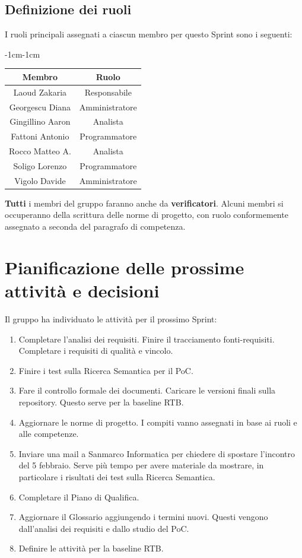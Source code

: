 \documentclass[a4paper,12pt]{article}
\begin{document}
\subsection{Definizione dei ruoli}
I ruoli principali assegnati a ciascun membro per questo Sprint sono i seguenti:
\begin{table}[H]
    \begin{adjustwidth}{-1cm}{-1cm}
    \centering
\begin{tabular}{|c|c|}
    \hline
    \textbf{Membro} & \textbf{Ruolo} \\
    \hline
    Laoud Zakaria & Responsabile \\
    \hline
    Georgescu Diana & Amministratore \\
    \hline
    Gingillino Aaron & Analista \\
    \hline
    Fattoni Antonio & Programmatore \\
    \hline
    Rocco Matteo A. & Analista \\
    \hline
    Soligo Lorenzo & Programmatore \\
    \hline
    Vigolo Davide & Amministratore \\
    \hline
\end{tabular}
    \end{adjustwidth}
\end{table}
\textbf{Tutti} i membri del gruppo faranno anche da \textbf{verificatori}. Alcuni membri si occuperanno della scrittura delle norme di progetto, con ruolo conformemente assegnato a seconda del paragrafo di competenza.

\section{Pianificazione delle prossime attività e decisioni}
Il gruppo ha individuato le attività per il prossimo Sprint:
\begin{enumerate}[noitemsep]
    \item Completare l'analisi dei requisiti. Finire il tracciamento fonti-requisiti. Completare i requisiti di qualità e vincolo.
    \item Finire i test sulla Ricerca Semantica per il PoC.
    \item Fare il controllo formale dei documenti. Caricare le versioni finali sulla repository. Questo serve per la baseline RTB.
    \item Aggiornare le norme di progetto. I compiti vanno assegnati in base ai ruoli e alle competenze.
    \item Inviare una mail a Sanmarco Informatica per chiedere di spostare l'incontro del 5 febbraio. Serve più tempo per avere materiale da mostrare, in particolare i risultati dei test sulla Ricerca Semantica.
    \item Completare il Piano di Qualifica.
    \item Aggiornare il Glossario aggiungendo i termini nuovi. Questi vengono dall'analisi dei requisiti e dallo studio del PoC.
    \item Definire le attività per la baseline RTB.
\end{enumerate}
\end{document}
